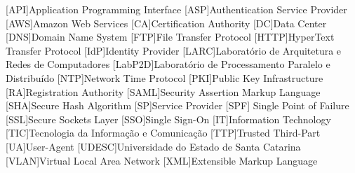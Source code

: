 

\begin{acronym}%
[API]{Application Programming Interface}
[ASP]{Authentication Service Provider}
[AWS]{Amazon Web Services}
[CA]{Certification Authority}
[DC]{Data Center}
[DNS]{Domain Name System}
[FTP]{File Transfer Protocol}
[HTTP]{HyperText Transfer Protocol}
[IdP]{Identity Provider}
[LARC]{Laborat\'{o}rio de Arquitetura e Redes de Computadores}
[LabP2D]{Laborat\'{o}rio de Processamento Paralelo e Distribu\'{i}do}
[NTP]{Network Time Protocol}
[PKI]{Public Key Infrastructure}
[RA]{Registration Authority}
[SAML]{Security Assertion Markup Language}
[SHA]{Secure Hash Algorithm}
[SP]{Service Provider}
[SPF] {Single Point of Failure}
[SSL]{Secure Sockets Layer}
[SSO]{Single Sign-On}
[IT]{Information Technology}
[TIC]{Tecnologia da Informa\c{c}\~{a}o e Comunica\c{c}\~{a}o}
[TTP]{Trusted Third-Part}
[UA]{User-Agent}
[UDESC]{Universidade do Estado de Santa Catarina}
[VLAN]{Virtual Local Area Network}
[XML]{Extensible Markup Language}

\end{acronym}%
